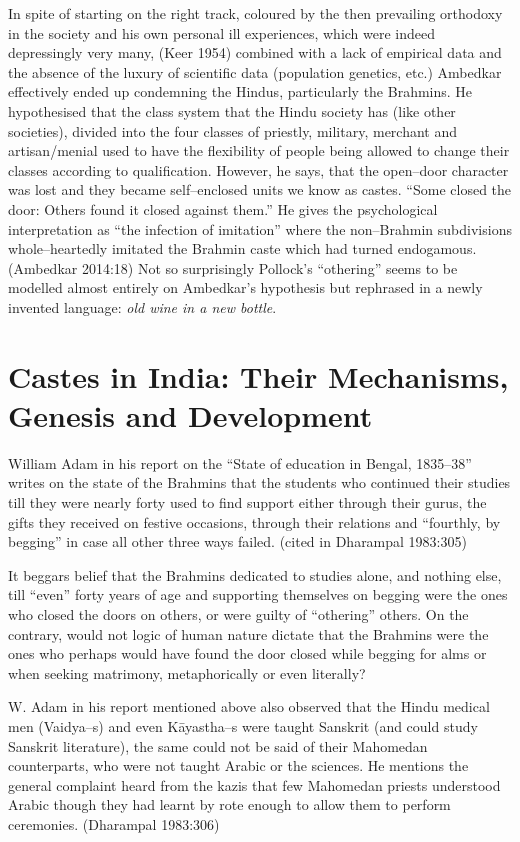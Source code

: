 In spite of starting on the right track, coloured by the then prevailing orthodoxy in the society and his own personal ill experiences, which were indeed depressingly very many, (Keer 1954) combined with a lack of empirical data and the absence of the luxury of scientific data (population genetics, etc.) Ambedkar effectively ended up condemning the Hindus, particularly the Brahmins. He hypothesised that the class system that the Hindu society has (like other societies), divided into the four classes of priestly, military, merchant and artisan/menial used to have the flexibility of people being allowed to change their classes according to qualification. However, he says, that the open–door character was lost and they became self–enclosed units we know as castes. “Some closed the door: Others found it closed against them.” He gives the psychological interpretation as “the infection of imitation” where the non–Brahmin subdivisions whole–heartedly imitated the Brahmin caste which had turned endogamous. (Ambedkar 2014:18) Not so surprisingly Pollock's “othering” seems to be modelled almost entirely on Ambedkar's hypothesis but rephrased in a newly invented language: \textit{old wine in a new bottle}.


\section*{Castes in India: Their Mechanisms, Genesis and Development}

William Adam in his report on the “State of education in Bengal, 1835–38” writes on the state of the Brahmins that the students who continued their studies till they were nearly forty used to find support either through their gurus, the gifts they received on festive occasions, through their relations and “fourthly, by begging” in case all other three ways failed. (cited in Dharampal 1983:305)

It beggars belief that the Brahmins dedicated to studies alone, and nothing else, till “even” forty years of age and supporting themselves on begging were the ones who closed the doors on others, or were guilty of “othering” others. On the contrary, would not logic of human nature dictate that the Brahmins were the ones who perhaps would have found the door closed while begging for alms or when seeking matrimony, metaphorically or even literally?

W. Adam in his report mentioned above also observed that the Hindu medical men (Vaidya–s) and even Kāyastha–s were taught Sanskrit (and could study Sanskrit literature), the same could not be said of their Mahomedan counterparts, who were not taught Arabic or the sciences. He mentions the general complaint heard from the kazis that few Mahomedan priests understood Arabic though they had learnt by rote enough to allow them to perform ceremonies. (Dharampal 1983:306)

